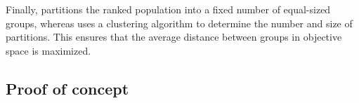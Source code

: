 Finally, \motos{} partitions the ranked population into a fixed number of equal-sized groups, whereas \AlgName{} uses a clustering algorithm to determine the number and size of partitions. This ensures that the average distance between groups in objective space is maximized. %

\subsection{Proof of concept}

